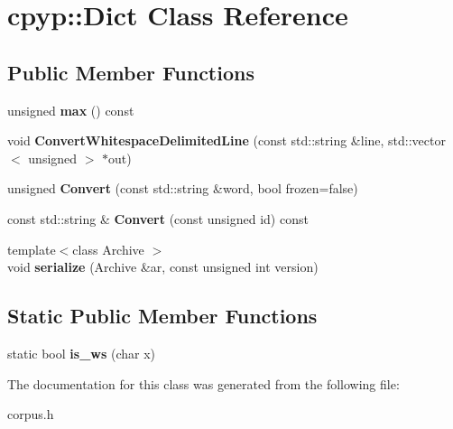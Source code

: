 \hypertarget{classcpyp_1_1_dict}{}\section{cpyp\+:\+:Dict Class Reference}
\label{classcpyp_1_1_dict}
\subsection*{Public Member Functions}
\begin{DoxyCompactItemize}
\item 
\mbox{\label{classcpyp_1_1_dict_a65fa4adaf069bb201f667e30f94e30a2}} 
unsigned {\bfseries max} () const
\item 
\mbox{\label{classcpyp_1_1_dict_aeec86f19705453f29c292e988fe4b94e}} 
void {\bfseries Convert\+Whitespace\+Delimited\+Line} (const std\+::string \&line, std\+::vector$<$ unsigned $>$ $\ast$out)
\item 
\mbox{\label{classcpyp_1_1_dict_a39abdd4620a36a474fc0cad254b677c9}} 
unsigned {\bfseries Convert} (const std\+::string \&word, bool frozen=false)
\item 
\mbox{\label{classcpyp_1_1_dict_aafae11d48224b91ded1f16d7e981c530}} 
const std\+::string \& {\bfseries Convert} (const unsigned id) const
\item 
\mbox{\label{classcpyp_1_1_dict_a063c1faa5946458f430b585a75fb036c}} 
{\footnotesize template$<$class Archive $>$ }\\void {\bfseries serialize} (Archive \&ar, const unsigned int version)
\end{DoxyCompactItemize}
\subsection*{Static Public Member Functions}
\begin{DoxyCompactItemize}
\item 
\mbox{\label{classcpyp_1_1_dict_ab2b50cccf4e3f501eec45df7f7d65507}} 
static bool {\bfseries is\+\_\+ws} (char x)
\end{DoxyCompactItemize}


The documentation for this class was generated from the following file\+:\begin{DoxyCompactItemize}
\item 
corpus.\+h\end{DoxyCompactItemize}
